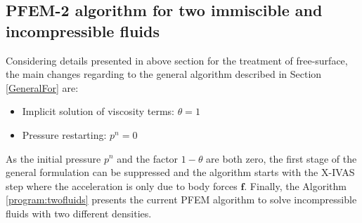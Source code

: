 \subsection{PFEM-2 algorithm for two immiscible and incompressible fluids}

Considering details presented in above section for the treatment of free-surface, the main changes regarding to the general algorithm described in Section \ref{GeneralFor} are:
\begin{itemize}
  \item Implicit solution of viscosity terms: $\theta=1$
  \item Pressure restarting: $p^n=0$
\end{itemize}
As the initial pressure $p^n$ and the factor $1-\theta$ are both zero, the first stage of the general formulation can be suppressed and the algorithm starts with the X-IVAS step where the acceleration is only due to body forces $\mathbf{f}$. Finally, the Algorithm \ref{program:twofluids} presents the current PFEM algorithm to solve incompressible fluids with two different densities.


